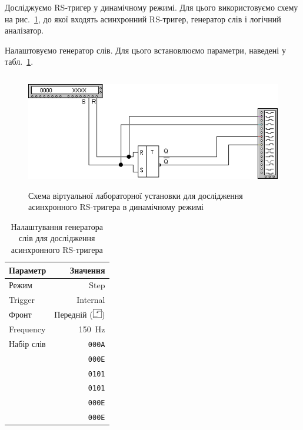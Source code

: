 \documentclass[a4paper,oneside,DIV=10,12pt]{scrartcl}
\newcommand\hexword[1]{\texttt{#1}}
\begin{document}
			Досліджуємо RS-тригер у динамічному режимі. Для цього використовуємо схему на рис.~\ref{fig:rs-flipflop-dynamic-mode-schematic}, до якої входять асинхронний RS-тригер, генератор слів і логічний аналізатор.
			
			Налаштовуємо генератор слів. Для цього встановлюємо параметри, наведені у табл.~\ref{tab:rs-flipflop-word-generator-settings}.
			
			\begin{figure}[!htbp]
			\centering
				\includegraphics[height=50mm]{assets/01-02-rs-flipflop-dynamic-mode-schematic.png}
			\caption{Схема віртуальної лабораторної установки для дослідження асинхронного RS-тригера в динамічному режимі}
			\label{fig:rs-flipflop-dynamic-mode-schematic}
			\end{figure}
			
			\begin{table}[!htbp]
			\centering
				\begin{tabular}{lr}
					\toprule
						Параметр & Значення\\
					\midrule
						Режим & Step\\
						Trigger & Internal\\
						Фронт & Передній (\includegraphics[height = 1em]{assets/front-setting-button.png})\\
						Frequency & 150~Hz\\
						Набір слів & \hexword{000A}\\
						           & \hexword{000E}\\
						           & \hexword{0101}\\
						           & \hexword{0101}\\
						           & \hexword{000E}\\
						           & \hexword{000E}\\
					\bottomrule
				\end{tabular}
			\caption{Налаштування генератора слів для дослідження асинхронного RS-тригера}
			\label{tab:rs-flipflop-word-generator-settings}
			\end{table}
			
\end{document}
